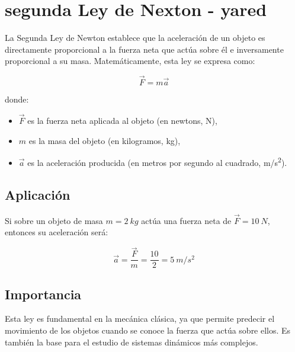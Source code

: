 
\section{segunda Ley de Nexton - yared}

La Segunda Ley de Newton establece que la aceleración de un objeto es directamente proporcional a la fuerza neta que actúa sobre él e inversamente proporcional a su masa. Matemáticamente, esta ley se expresa como:

\begin{equation}
    \vec{F} = m \vec{a}
\end{equation}

donde:
\begin{itemize}
    \item $\vec{F}$ es la fuerza neta aplicada al objeto (en newtons, N),
    \item $m$ es la masa del objeto (en kilogramos, kg),
    \item $\vec{a}$ es la aceleración producida (en metros por segundo al cuadrado, m/s\textsuperscript{2}).
\end{itemize}

\subsection{Aplicación}

Si sobre un objeto de masa $m = \SI{2}{kg}$ actúa una fuerza neta de $\vec{F} = \SI{10}{N}$, entonces su aceleración será:

\begin{equation}
    \vec{a} = \frac{\vec{F}}{m} = \frac{10}{2} = \SI{5}{m/s^2}
\end{equation}

\subsection{Importancia}

Esta ley es fundamental en la mecánica clásica, ya que permite predecir el movimiento de los objetos cuando se conoce la fuerza que actúa sobre ellos. Es también la base para el estudio de sistemas dinámicos más complejos.

